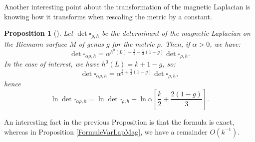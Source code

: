 \documentclass{article}
\newtheorem{Proposition}[theorem]{Proposition}
\theoremstyle{definition}
\theoremstyle{remark}
\begin{document}
Another interesting point about the transformation of the magnetic Laplacian is knowing how it transforms when rescaling the metric by a constant.
\begin{Proposition}[{\cite[eq. (2.39)]{Fay1992KernelFA}}]\label{ConstantLapMag}
    Let $\det \square_{\rho,h}$ be the determinant of the magnetic Laplacian on the Riemann surface $M$ of genus $g$ for the metric $\rho$. Then, if $\alpha > 0$, we have:
    \[
    \det \square_{\alpha \rho,h} = \alpha^{h^{0}(L) - \frac{k}{2} - \frac{1}{3}(1 - g)} \det \square_{\rho,h}.
    \]
    In the case of interest, we have $h^{0}(L) = k + 1 - g$, so:
    \[
    \det \square_{\alpha \rho,h} = \alpha^{\frac{k}{2} + \frac{2}{3}(1 - g)} \det \square_{\rho,h},
    \]
    hence
    \[
    \ln \det \square_{\alpha \rho,h} = \ln \det \square_{\rho,h} + \ln \alpha \left[ \frac{k}{2} + \frac{2(1 - g)}{3} \right].
    \]
\end{Proposition}
An interesting fact in the previous Proposition is that the formula is exact, whereas in Proposition \ref{FormuleVarLapMag}, we have a remainder $O\left(k^{-1} \right)$.
\end{document}
